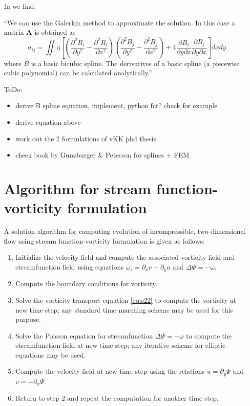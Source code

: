 \noindent In \textcite{mayu92} we find: 
\begin{displayquote}
{\color{darkgray}
``We can use the Galerkin method to approximate the solution. In this
case a matrix ${\bm A}$ is obtained as
\[
a_{ij} = \iint \eta
\left[
\left(\frac{\partial^2 B_i}{\partial y^2}-\frac{\partial^2 B_i}{\partial x^2}\right)
\left(\frac{\partial^2 B_j}{\partial y^2}-\frac{\partial^2 B_j}{\partial x^2}\right)
+4\frac{\partial B_i}{\partial y\partial x}\frac{\partial B_j}{\partial y \partial x}
\right]
dxdy
\]
where $B$ is a basic bicubic spline.
The derivatives of a basic spline (a piecewise cubic
polynomial) can be calculated analytically.''
}
\end{displayquote}

\vspace{0.5cm}

{\color{orange} 
ToDo: 
\begin{itemize}
\item derive B spline equation, implement, python fct? check for example \cite{kopi79}
\item derive equation above
\item work out the 2 formulations of vKK phd thesis
\item check book by Gunzburger \& Peterson for splines + FEM
\end{itemize}
}

\section{Algorithm for stream function-vorticity formulation}

A solution algorithm for computing evolution of incompressible, two-dimensional flow using stream function-vorticity formulation is given as follows:
\begin{enumerate}
\item Initialize the velocity field and compute the associated vorticity field and streamfunction field
using equations $\omega_z = \partial_x v- \partial_y u$ and $\Delta \Psi = -\omega$.
\item Compute the boundary conditions for vorticity.
\item Solve the vorticity transport equation \eqref{eq:s22} to compute the vorticity at new time step; any standard time marching scheme may be used for this purpose.
\item Solve the Poisson equation for streamfunction $\Delta \Psi = -\omega$ to compute the streamfunction field at new time step; any iterative scheme for elliptic equations may be used.
\item Compute the velocity field at new time step using the relations $u=\partial_y \Psi$ and $v=-\partial_x \Psi$.
\item Return to step 2 and repeat the computation for another time step.
\end{enumerate}












